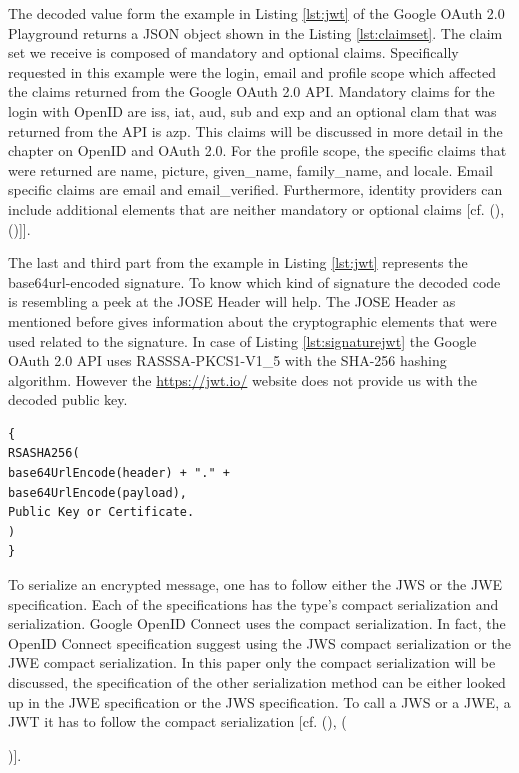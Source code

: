 {The decoded value form the example in Listing \ref{lst:jwt} of the Google OAuth 2.0 Playground \cite{Google:2018:OAuthPlayground} returns a JSON object shown in the Listing \ref{lst:claimset}. The claim set we receive is composed of mandatory and optional claims. Specifically requested in this example were the login, email and profile scope which affected the claims returned from the Google OAuth 2.0 API. Mandatory claims for the login with OpenID are iss, iat, aud, sub and exp and an optional clam that was returned from the API is azp. This claims will be discussed in more detail in the chapter on OpenID and OAuth 2.0. For the profile scope, the specific claims that were returned are name, picture, given\_name, family\_name, and locale. Email specific claims are email and email\_verified. Furthermore, identity providers can include additional elements that are neither mandatory or optional claims [cf. ({\cite{Google:2018:OAuthPlayground}),(\cite{Siriwardena:JWTJWSJWE:2016})]}].

The last and third part from the example in  Listing \ref{lst:jwt}  represents the base64url-encoded signature. To know which kind of signature the decoded code is resembling a peek at the JOSE Header will help. The JOSE Header as mentioned before gives information about the cryptographic elements that were used related to the signature. In case of Listing \ref{lst:signaturejwt} the Google OAuth 2.0 API uses RASSSA-PKCS1-V1\_5 with the SHA-256 hashing algorithm. However the \href{https://jwt.io/} {https://jwt.io/} website does not provide us with the decoded public key. 

\begin{lstlisting}
{
RSASHA256(
base64UrlEncode(header) + "." +
base64UrlEncode(payload),
Public Key or Certificate.
)
}
\end{lstlisting}


To serialize an encrypted message, one has to follow either the JWS or the JWE specification. Each of the specifications has the type’s compact serialization and serialization. Google OpenID Connect uses the compact serialization. In fact, the OpenID Connect specification suggest using the JWS compact serialization or the JWE compact serialization. In this paper only the compact serialization will be discussed, the specification of the other serialization method can be either looked up in the JWE specification or the JWS specification. To call a JWS or a JWE, a JWT it has to follow the compact serialization [cf. (\cite{JWS:IETF:Jones:2015}), ({\cite{JWE:IETF:Jones:2015})].
	
}}
